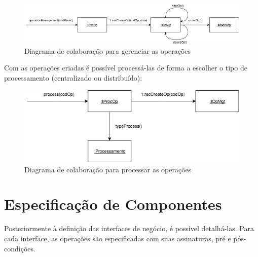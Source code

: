 \begin{figure}[h]
	\centering
	\includegraphics[scale=0.5]{fig/operationManagement.png}
	\caption{Diagrama de colaboração para gerenciar as operações}
	\label{operationManagement}
\end{figure}

Com as operações criadas é possível processá-las de forma a escolher o tipo de processamento (centralizado ou distribuído):

\begin{figure}[h]
	\centering
	\includegraphics[scale=0.5]{fig/process.png}
	\caption{Diagrama de colaboração para processar as operações}
	\label{process}
\end{figure}

\section{Especificação de Componentes}

Posteriormente à definição das interfaces de negócio, é possível detalhá-las. Para cada interface, as operações são especificadas com suas assinaturas, pré e pós-condições.

